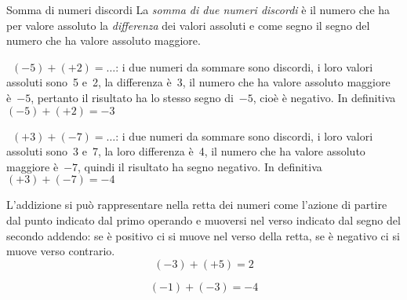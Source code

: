 \begin{definizione}{Somma di numeri discordi}{}
La \emph{somma di due numeri discordi} è il numero che ha per 
valore assoluto la \emph{differenza} dei valori assoluti
e come segno il segno del numero che ha valore assoluto maggiore.
\end{definizione}

\begin{esempio}{}{}
~\((-5)+(+2)=\ldots\): i due numeri da sommare sono discordi, i loro valori 
assoluti sono~5 e~2, la differenza è~3,
il numero che ha valore assoluto maggiore è~\(-5\), pertanto il risultato 
ha lo stesso segno di~\(-5\), cioè è negativo.
In definitiva~\((-5)+(+2)=-3\)
\end{esempio}


\begin{esempio}{}{}
~\((+3)+(-7)=\ldots\): i due numeri da sommare sono discordi, i loro valori 
assoluti sono~3 e~7, la loro differenza è~4,
il numero che ha valore assoluto maggiore è~\(-7\), quindi il risultato ha 
segno negativo.
In definitiva~\((+3)+(-7)=-4\)
\end{esempio}

L'addizione si può rappresentare nella retta dei numeri come l'azione di 
partire dal punto indicato dal primo operando e 
muoversi nel verso indicato dal segno del secondo addendo: 
se è positivo ci si muove nel verso della retta, 
se è negativo ci si muove verso contrario.
\[(-3)+(+5)=2\]
\begin{center}
\intaddlinea

\end{center}
\[ (-1)+(-3) = -4\]
\begin{center}
\intaddlineb
\end{center}



